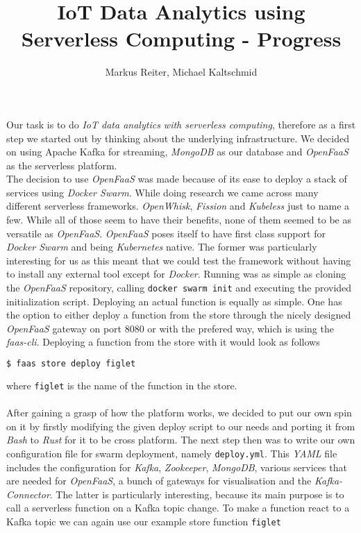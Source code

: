 \documentclass{article}
\title{IoT Data Analytics using Serverless Computing - Progress}
\author{Markus Reiter, Michael Kaltschmid}
\date{}
\begin{document}
  \maketitle

  Our task is to do \textit{IoT data analytics with serverless computing}, therefore as a first step we started out by thinking about the underlying infrastructure. We decided on using Apache Kafka for streaming,  \textit{MongoDB} as our database and \textit{OpenFaaS} as the serverless platform. \\
  The decision to use \textit{OpenFaaS} was made because of its ease to deploy a stack of services using \textit{Docker Swarm}.
  While doing research we came across many different serverless frameworks. \textit{OpenWhisk}, \textit{Fission} and \textit{Kubeless} just to name a few. While all of those seem to have their benefits, none of them seemed to be as versatile as \textit{OpenFaaS}. \textit{OpenFaaS} poses itself to have first class support for \textit{Docker Swarm} and being \textit{Kubernetes} native. The former was particularly interesting for us as this meant that we could test the framework without having to install any external tool except for  \textit{Docker}. Running was as simple as cloning the \textit{OpenFaaS} repository, calling \texttt{docker swarm init} and executing the provided initialization script. Deploying an actual function is equally as simple. One has the option to either deploy a function from the store through the nicely designed  \textit{OpenFaaS} gateway on port 8080 or with the prefered way, which is using the \textit{faas-cli}. Deploying a function from the store with it would look as follows

  \begin{lstlisting}[language=bash]
    $ faas store deploy figlet
  \end{lstlisting}

  where \texttt{figlet} is the name of the function in the store.\\
  \\
  After gaining a grasp of how the platform works, we decided to put our own spin on it by firstly modifying the given deploy script to our needs and porting it from \textit{Bash} to \textit{Rust} for it to be cross platform. The next step then was to write our own configuration file for swarm deployment, namely \texttt{deploy.yml}. This \textit{YAML} file includes the configuration for \textit{Kafka}, \textit{Zookeeper}, \textit{MongoDB}, various services that are needed for \textit{OpenFaaS}, a bunch of gateways for visualisation and the \textit{Kafka-Connector}. The latter is particularly interesting, because its main purpose is to call a serverless function on a Kafka topic change. To make a function react to a Kafka topic we can again use our example store function \texttt{figlet}
\end{document}
